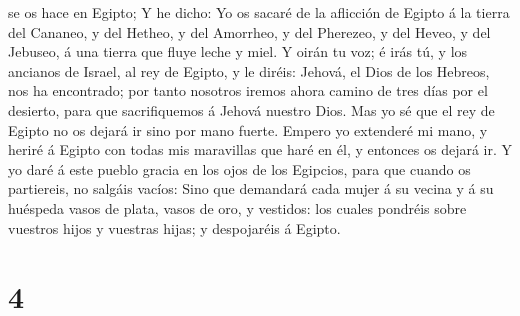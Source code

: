 se os hace en Egipto;  Y he dicho: Yo os sacaré de la
aflicción de Egipto á la tierra del Cananeo, y del Hetheo, y del
Amorrheo, y del Pherezeo, y del Heveo, y del Jebuseo, á una tierra que
fluye leche y miel.  Y oirán tu voz; é irás tú, y los
ancianos de Israel, al rey de Egipto, y le diréis: Jehová, el Dios de
los Hebreos, nos ha encontrado; por tanto nosotros iremos ahora camino
de tres días por el desierto, para que sacrifiquemos á Jehová nuestro
Dios.  Mas yo sé que el rey de Egipto no os dejará ir sino
por mano fuerte.  Empero yo extenderé mi mano, y heriré á
Egipto con todas mis maravillas que haré en él, y entonces os dejará ir.
 Y yo daré á este pueblo gracia en los ojos de los
Egipcios, para que cuando os partiereis, no salgáis vacíos:
 Sino que demandará cada mujer á su vecina y á su huéspeda
vasos de plata, vasos de oro, y vestidos: los cuales pondréis sobre
vuestros hijos y vuestras hijas; y despojaréis á Egipto.

\hypertarget{section-3}{%
\section{4}\label{section-3}}


